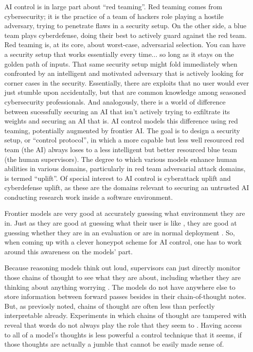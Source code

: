 AI control is in large part about ``red teaming''. Red teaming comes from
cybersecurity; it is the practice of a team of hackers role playing a hostile
adversary, trying to penetrate flaws in a security setup. On the other side, a
blue team plays cyberdefense, doing their best to actively guard against the
red team. Red teaming is, at its core, about worst-case, adversarial selection.
You can have a security setup that works essentially every time... so long as
it stays on the golden path of inputs. That same security setup might fold
immediately when confronted by an intelligent and motivated adversary that is
actively looking for corner cases in the security. Essentially, there are
exploits that no user would ever just stumble upon accidentally, but that are
common knowledge among seasoned cybersecurity professionals. And analogously,
there is a world of difference between sucessfully securing an AI that isn't
actively trying to exfiltrate its weights and securing an AI that is. AI
control models this difference using red teaming, potentially augmented by
frontier AI. The goal is to design a security setup, or ``control protocol'',
in which a more capable but less well resourced red team (the AI) always loses
to a less intelligent but better resourced blue team (the human supervisors).
The degree to which various models enhance human abilities in various domains,
particularly in red team adversarial attack domains, is termed ``uplift''. Of
special interest to AI control is cyberattack uplift and cyberdefense uplift,
as these are the domains relevant to securing an untrusted AI conducting
research work inside a software environment.

Frontier models are very good at accurately guessing what environment they are
in. Just as they are good at guessing what their user is like
\cite{derner2024truesight}, they are good at guessing whether they are in an
evaluation or are in normal deployment \cite{needham2025know}. So, when coming
up with a clever honeypot scheme for AI control, one has to work around this
awareness on the models' part.

Because reasoning models think out loud, supervisors can just directly monitor
those chains of thought to see what they are about, including whether they are
thinking about anything worrying \cite{baker2025monitoring}. The models do not
have anywhere else to store information between forward passes besides in their
chain-of-thought notes. But, as previosly noted, chains of thought are often
less than perfectly interpretable already. Experiments in which chains of
thought are tampered with reveal that words do not always play the role that
they seem to \cite{}. Having access to all of a model's thoughts is less
powerful a control technique that it seems, if those thoughts are actually a
jumble that cannot be easily made sense of.

